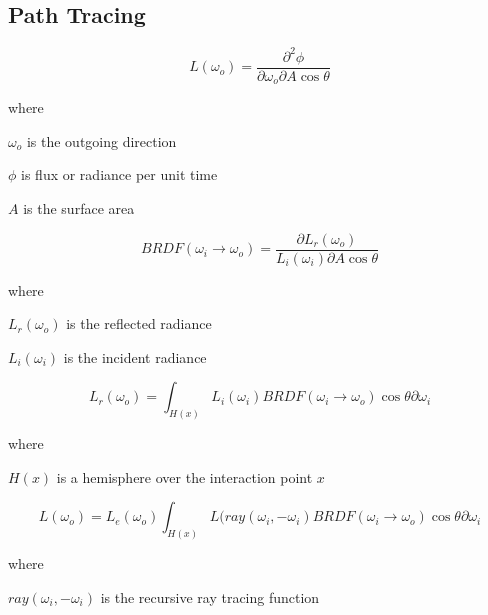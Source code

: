 \subsection{Path Tracing}


\begin{equation}
L(\omega_{o}) = \frac{\partial^2\phi}{\partial\omega_{o}\partial A\cos\theta}
\end{equation}

\noindent where
\begin{description}
	\setlength\itemsep{0.05em}
	\item  $\omega_{o}$ is the outgoing direction
	\item  $\phi$ is flux or radiance per unit time
	\item  $A$ is the surface area
\end{description}


\begin{equation}
BRDF(\omega_{i} \rightarrow \omega_{o}) = \frac{\partial L_{r}(\omega_{o})}{L_{i}(\omega_{i})\partial A\cos\theta}
\end{equation}

\noindent where
\begin{description}
	\setlength\itemsep{0.05em}
	\item  $L_r(\omega_{o})$ is the reflected radiance
	\item  $L_i(\omega_{i})$ is the incident radiance
\end{description}

\begin{equation}
L_{r}(\omega_{o}) = \int_{H(x)} L_{i}(\omega_{i})  BRDF(\omega_{i} \rightarrow \omega_{o}) \cos\theta\partial\omega_{i}
\end{equation}

\noindent where
\begin{description}
	\setlength\itemsep{0.05em}
	\item  $H(x)$ is a hemisphere over the interaction point $x$
\end{description}

\begin{equation}
L(\omega_{o}) = L_{e}(\omega_{o}) \int_{H(x)} L(ray(\omega_{i}, -\omega_{i})BRDF(\omega_{i} \rightarrow \omega_{o})\cos\theta\partial\omega_{i}
\end{equation}

\noindent where
\begin{description}
	\setlength\itemsep{0.05em}
	\item  $ray(\omega_{i}, -\omega_{i})$ is the recursive ray tracing function
\end{description}

